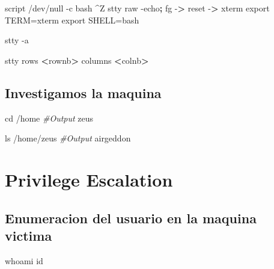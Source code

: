 \documentclass{assets/ipesethesis}
\newenvironment{Shaded}{\begin{snugshade}}{\end{snugshade}}
\newcommand{\BuiltInTok}[1]{#1}
\newcommand{\CommentTok}[1]{\textcolor[rgb]{0.56,0.35,0.01}{\textit{#1}}}
\newcommand{\ExtensionTok}[1]{#1}
\newcommand{\FunctionTok}[1]{\textcolor[rgb]{0.00,0.00,0.00}{#1}}
\newcommand{\KeywordTok}[1]{\textcolor[rgb]{0.13,0.29,0.53}{\textbf{#1}}}
\newcommand{\NormalTok}[1]{#1}
\newcommand{\OperatorTok}[1]{\textcolor[rgb]{0.81,0.36,0.00}{\textbf{#1}}}
\newcommand{\VariableTok}[1]{\textcolor[rgb]{0.00,0.00,0.00}{#1}}
\begin{document}
\begin{Shaded}
\begin{Highlighting}[]
\ExtensionTok{script}\NormalTok{ /dev/null -c bash}
\NormalTok{^}\ExtensionTok{Z}
\FunctionTok{stty}\NormalTok{ raw -echo}\KeywordTok{;} \BuiltInTok{fg}
\ExtensionTok{-}\OperatorTok{>}\NormalTok{ reset}
\ExtensionTok{-}\OperatorTok{>}\NormalTok{ xterm}
\BuiltInTok{export} \VariableTok{TERM=}\NormalTok{xterm}
\BuiltInTok{export} \VariableTok{SHELL=}\NormalTok{bash}

\FunctionTok{stty}\NormalTok{ -a}

\FunctionTok{stty}\NormalTok{ rows }\OperatorTok{<}\NormalTok{rownb}\OperatorTok{>}\NormalTok{ columns }\OperatorTok{<}\NormalTok{colnb}\OperatorTok{>}
\end{Highlighting}
\end{Shaded}

\hypertarget{investigamos-la-maquina-1}{%
\subsection*{Investigamos la maquina}\label{investigamos-la-maquina-1}}

\begin{Shaded}
\begin{Highlighting}[]
\BuiltInTok{cd}\NormalTok{ /home}
\CommentTok{#Output}
\ExtensionTok{zeus}

\FunctionTok{ls}\NormalTok{ /home/zeus}
\CommentTok{#Output}
\ExtensionTok{airgeddon}
\end{Highlighting}
\end{Shaded}

\hypertarget{privilege-escalation-2}{%
\section*{Privilege Escalation}\label{privilege-escalation-2}}

\hypertarget{enumeracion-del-usuario-en-la-maquina-victima-2}{%
\subsection*{Enumeracion del usuario en la maquina victima}\label{enumeracion-del-usuario-en-la-maquina-victima-2}}

\begin{Shaded}
\begin{Highlighting}[]
\FunctionTok{whoami}
\FunctionTok{id}
\end{Highlighting}
\end{Shaded}


\end{document}
